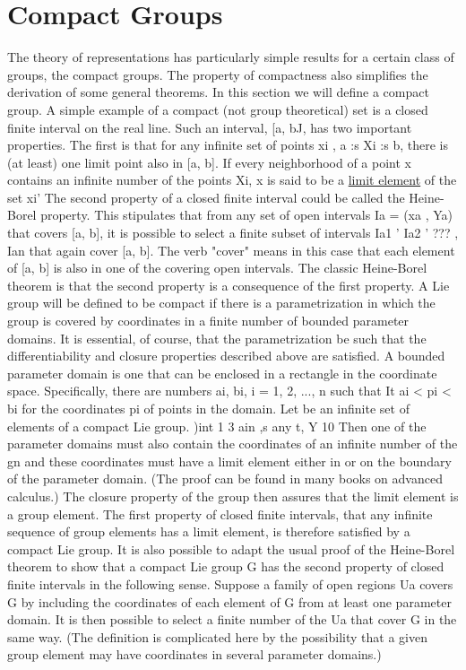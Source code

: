 \section[Compact Groups]{Compact Groups}

The theory of representations has particularly simple results for a certain class of groups, the compact groups. The property of compactness also simplifies the derivation of some general theorems.
In this section we will define a compact group.
A simple example of a compact (not group theoretical) set is a closed finite interval on the real line. Such an interval, [a, bJ, has two important properties. The first is that for any infinite set of points { xi} , a :s Xi :s b, there is (at least) one limit point also in
[a, b]. If every neighborhood of a point x contains an infinite number of the points Xi, x is said to be a \uline{limit element} of the set {xi}' The second property of a closed finite interval could be called the Heine-Borel property. This stipulates that from any set of open intervals Ia = (xa , Ya) that covers [a, b], it is possible to select a finite subset of intervals Ia1 ' Ia2 ' ??? , Ian that again cover [a, b]. The verb "cover" means in this case that each element of [a, b] is also in one of the covering open intervals. The classic Heine-Borel theorem is that the second property is a consequence of the first property.
A Lie group will be defined to be compact if there is a parametrization in which the group is covered by coordinates in a finite number of bounded parameter domains. It is essential, of course, that the parametrization be such that the differentiability and closure properties described above are satisfied. A bounded parameter domain is one that can be enclosed in a rectangle in the coordinate space. Specifically, there are numbers ai, bi, i = 1, 2, ..., n such that
It ai < pi < bi for the coordinates pi of points in the domain.
Let  be an infinite set of elements of a compact Lie group.
)int
1
3
ain ,s
any
t,
Y 10
Then one of the parameter domains must also contain the coordinates of an infinite number of the gn and these coordinates must have a limit element either in or on the boundary of the parameter domain. (The proof can be found in many books on advanced calculus.) The closure property of the group then assures that the limit element is
a group element. The first property of closed finite intervals, that any infinite sequence of group elements has a limit element, is therefore satisfied by a compact Lie group.
It is also possible to adapt the usual proof of the Heine-Borel theorem to show that a compact Lie group G has the second property of closed finite intervals in the following sense. Suppose a family of open regions Ua covers G by including the coordinates of each element of G from at least one parameter domain. It is then possible to select a finite number of the Ua that cover G in the same way. (The definition is complicated here by the possibility that a given group element may have coordinates in several parameter domains.)

\endinput  %